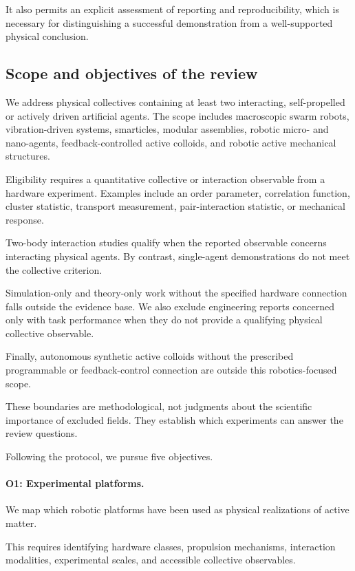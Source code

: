 It also permits
an explicit
assessment of
reporting and
reproducibility,
which is necessary
for distinguishing
a successful
demonstration from
a well-supported
physical conclusion.

\subsection{Scope and objectives of the review}
\label{sec:introduction-objectives}

We address physical collectives containing
at least two interacting, self-propelled
or actively driven artificial agents.
The scope includes macroscopic swarm
robots, vibration-driven systems,
smarticles, modular assemblies,
robotic micro- and nano-agents,
feedback-controlled active colloids,
and robotic active mechanical structures.

Eligibility requires a quantitative
collective or interaction observable
from a hardware experiment.
Examples include an order parameter,
correlation function,
cluster statistic,
transport measurement,
pair-interaction statistic,
or mechanical response.

Two-body interaction studies
qualify when the reported
observable concerns
interacting physical agents.
By contrast,
single-agent demonstrations
do not meet the
collective criterion.

Simulation-only and
theory-only work
without the specified
hardware connection
falls outside the
evidence base.
We also exclude
engineering reports
concerned only
with task performance
when they do not
provide a qualifying
physical collective
observable.

Finally, autonomous
synthetic active
colloids without
the prescribed
programmable or
feedback-control
connection are
outside this
robotics-focused scope.

These boundaries
are methodological,
not judgments
about the scientific
importance of
excluded fields.
They establish
which experiments
can answer the
review questions.

Following the protocol,
we pursue five objectives.

\paragraph*{O1: Experimental platforms.}

We map which robotic platforms have been
used as physical realizations
of active matter.

This requires
identifying hardware
classes, propulsion
mechanisms,
interaction modalities,
experimental scales,
and accessible
collective observables.

